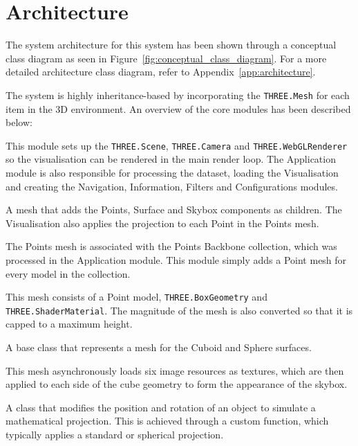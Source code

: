\section{Architecture} {
\label{sec:architecture}

	The system architecture for this system has been shown through a conceptual class diagram as seen in Figure~\ref{fig:conceptual_class_diagram}. For a more detailed architecture class diagram, refer to Appendix~\ref{app:architecture}.

	

	The system is highly inheritance-based by incorporating the \texttt{THREE.Mesh} for each item in the 3D environment. An overview of the core modules has been described below:

	\begin{sloppypar}
		\begin{description}[leftmargin=0pt]
			\item [Application:] This module sets up the \texttt{THREE.Scene}, \texttt{THREE.Camera} and \texttt{THREE.WebGLRenderer} so the visualisation can be rendered in the main render loop. The Application module is also responsible for processing the dataset, loading the Visualisation and creating the Navigation, Information, Filters and Configurations modules. 
			\item[Visualisation:] A mesh that adds the Points, Surface and Skybox components as children. The Visualisation also applies the projection to each Point in the Points mesh.
			\item[Points:] The Points mesh is associated with the Points Backbone collection, which was processed in the Application module. This module simply adds a Point mesh for every model in the collection.
			\item[Point:] This mesh consists of a Point model, \texttt{THREE.BoxGeometry} and \texttt{THREE.ShaderMaterial}. The magnitude of the mesh is also converted so that it is capped to a maximum height.
			\item[Surface:] A base class that represents a mesh for the Cuboid and Sphere surfaces.
			\item[Skybox:] This mesh asynchronously loads six image resources as textures, which are then applied to each side of the cube geometry to form the appearance of the skybox.
			\item[Projection:] A class that modifies the position and rotation of an object to simulate a mathematical projection. This is achieved through a custom function, which typically applies a standard or spherical projection.

\end{description}
\end{sloppypar}}
